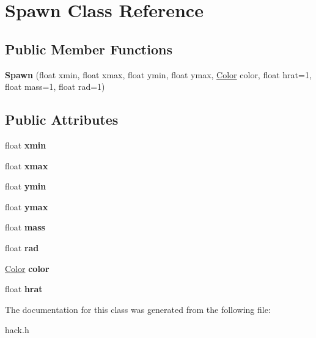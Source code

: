\hypertarget{class_spawn}{\section{Spawn Class Reference}
\label{class_spawn}
}
\subsection*{Public Member Functions}
\begin{DoxyCompactItemize}
\item 
\hypertarget{class_spawn_a7216c240501a371cd9c0b752698096af}{{\bfseries Spawn} (float xmin, float xmax, float ymin, float ymax, \hyperlink{class_color}{Color} color, float hrat=1, float mass=1, float rad=1)}\label{class_spawn_a7216c240501a371cd9c0b752698096af}

\end{DoxyCompactItemize}
\subsection*{Public Attributes}
\begin{DoxyCompactItemize}
\item 
\hypertarget{class_spawn_aeda64316c0a8ffca2da962cbd6e53de1}{float {\bfseries xmin}}\label{class_spawn_aeda64316c0a8ffca2da962cbd6e53de1}

\item 
\hypertarget{class_spawn_afd4c62cd67325dccfe7970bcb451409e}{float {\bfseries xmax}}\label{class_spawn_afd4c62cd67325dccfe7970bcb451409e}

\item 
\hypertarget{class_spawn_abcd0124e2b0d6b18f1240e1037b2d2ce}{float {\bfseries ymin}}\label{class_spawn_abcd0124e2b0d6b18f1240e1037b2d2ce}

\item 
\hypertarget{class_spawn_af3041b57a222968dcea6e0652d8e5c12}{float {\bfseries ymax}}\label{class_spawn_af3041b57a222968dcea6e0652d8e5c12}

\item 
\hypertarget{class_spawn_a228bf006bb6137fd632c238d9e876def}{float {\bfseries mass}}\label{class_spawn_a228bf006bb6137fd632c238d9e876def}

\item 
\hypertarget{class_spawn_a4521e63486a6cccbc110699c014ad95c}{float {\bfseries rad}}\label{class_spawn_a4521e63486a6cccbc110699c014ad95c}

\item 
\hypertarget{class_spawn_a1c3fca682e4a53b533a9c8b0b039b28a}{\hyperlink{class_color}{Color} {\bfseries color}}\label{class_spawn_a1c3fca682e4a53b533a9c8b0b039b28a}

\item 
\hypertarget{class_spawn_a02e45febfbb4ae0fc16f74395fc50018}{float {\bfseries hrat}}\label{class_spawn_a02e45febfbb4ae0fc16f74395fc50018}

\end{DoxyCompactItemize}


The documentation for this class was generated from the following file\-:\begin{DoxyCompactItemize}
\item 
hack.\-h\end{DoxyCompactItemize}
